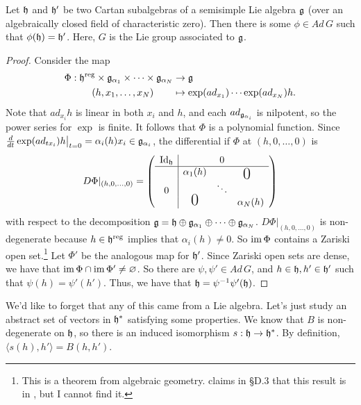  \begin{theorem}\label{lec14T:CSA}
   Let $\mathfrak{h}$ and $\mathfrak{h}'$ be two Cartan subalgebras of a
   semisimple Lie algebra $\mathfrak{g}$ (over an algebraically closed field of characteristic
   zero). Then there is some $\phi\in Ad\, G$ such that $\phi(\mathfrak{h})=\mathfrak{h}'$. Here, $G$ is
   the Lie group associated to $\mathfrak{g}$.
 \end{theorem}
 \begin{proof}
   Consider the map
   \begin{align*}
     \Phi:\mathfrak{h}^{\text{reg}}\times \mathfrak{g}_{\alpha_1}\times \cdots \times \mathfrak{g}_{\alpha_N} &\to \mathfrak{g} \\
     (h,x_1,\dots, x_N)\qquad & \mapsto \exp(ad_{x_1})\cdots \exp(ad_{x_N}) h.
   \end{align*}
   Note that $ad_{x_i}h$ is linear in both $x_i$ and $h$, and each $ad_{\mathfrak{g}_{\alpha_i}}$
   is nilpotent, so the power series for $\exp$ is finite. It follows that $\Phi$ is a
   polynomial function. Since $\frac{d }{d t}\exp(ad_{tx_i})h\big|_{t=0}=\alpha_i(h)x_i\in
   \mathfrak{g}_{\alpha_i}$, the differential if $\Phi$ at $(h,0,\dots,0)$ is
   \[
   D\Phi|_{(h,0,\dots, 0)} =
     \left(\begin{array}{c|ccc}
     \id_\h & & 0 \\ \hline
      & \alpha_1(h) & & \raisebox{-1ex}{\smash{\llap{\LARGE $0$}}}\\
     0& & \ddots\\
      & \smash{\mbox{\LARGE $0$}} & & \alpha_N(h)
     \end{array}\right)
   \]
   with respect to the decomposition $\mathfrak{g}=\mathfrak{h}\oplus \mathfrak{g}_{\alpha_1}\oplus\cdots\oplus
   \mathfrak{g}_{\alpha_N}$. $D\Phi|_{(h,0,\dots, 0)}$ is non-degenerate because $h\in
   \mathfrak{h}^{\text{reg}}$ implies that $\alpha_i(h)\neq 0$. So $\operatorname{im} \Phi$ contains a Zariski
   open set.\footnote{This is a theorem from algebraic geometry.
   \cite{FulHar} claims in \S D.3 that this result is in \cite{Hartshorne}, but I
   cannot find it.} Let $\Phi'$ be the analogous map for $\mathfrak{h}'$. Since Zariski open sets
   are dense, we have that $\operatorname{im} \Phi\cap \operatorname{im} \Phi' \neq \varnothing$. So there are
   $\psi,\psi'\in Ad\, G$, and $h\in \mathfrak{h}, h'\in \mathfrak{h}'$ such that $\psi(h)=\psi'(h')$. Thus,
   we have that $\mathfrak{h}=\psi^{-1}\psi'(\mathfrak{h})$.
 \end{proof}

 We'd like to forget that any of this came from a Lie algebra. Let's just study an
 abstract set of vectors in $\mathfrak{h}^*$ satisfying some properties. We know that $B$ is
 non-degenerate on $\mathfrak{h}$, so there is an induced isomorphism $s:\mathfrak{h}\to \mathfrak{h}^*$. By
 definition, $\langle s(h),h'\rangle = B(h,h')$.

